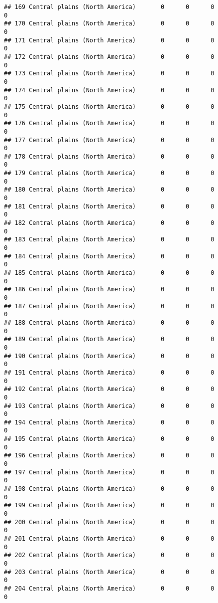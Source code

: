 \documentclass[]{article}
\begin{document}
\begin{verbatim}
## 169 Central plains (North America)       0      0      0             0
## 170 Central plains (North America)       0      0      0             0
## 171 Central plains (North America)       0      0      0             0
## 172 Central plains (North America)       0      0      0             0
## 173 Central plains (North America)       0      0      0             0
## 174 Central plains (North America)       0      0      0             0
## 175 Central plains (North America)       0      0      0             0
## 176 Central plains (North America)       0      0      0             0
## 177 Central plains (North America)       0      0      0             0
## 178 Central plains (North America)       0      0      0             0
## 179 Central plains (North America)       0      0      0             0
## 180 Central plains (North America)       0      0      0             0
## 181 Central plains (North America)       0      0      0             0
## 182 Central plains (North America)       0      0      0             0
## 183 Central plains (North America)       0      0      0             0
## 184 Central plains (North America)       0      0      0             0
## 185 Central plains (North America)       0      0      0             0
## 186 Central plains (North America)       0      0      0             0
## 187 Central plains (North America)       0      0      0             0
## 188 Central plains (North America)       0      0      0             0
## 189 Central plains (North America)       0      0      0             0
## 190 Central plains (North America)       0      0      0             0
## 191 Central plains (North America)       0      0      0             0
## 192 Central plains (North America)       0      0      0             0
## 193 Central plains (North America)       0      0      0             0
## 194 Central plains (North America)       0      0      0             0
## 195 Central plains (North America)       0      0      0             0
## 196 Central plains (North America)       0      0      0             0
## 197 Central plains (North America)       0      0      0             0
## 198 Central plains (North America)       0      0      0             0
## 199 Central plains (North America)       0      0      0             0
## 200 Central plains (North America)       0      0      0             0
## 201 Central plains (North America)       0      0      0             0
## 202 Central plains (North America)       0      0      0             0
## 203 Central plains (North America)       0      0      0             0
## 204 Central plains (North America)       0      0      0             0

\end{verbatim}
\end{document}
